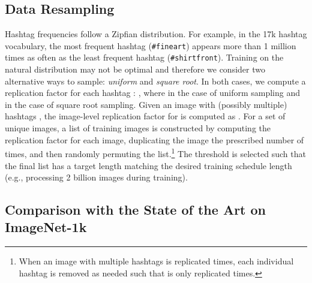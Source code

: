 \documentclass[runningheads]{llncs}
\makeatletter
\newcommand{\eg}{e.g.\@\xspace}
\makeatother
\begin{document}
\subsection{Data Resampling}
Hashtag frequencies follow a Zipfian distribution. For example, in the 17k hashtag vocabulary, the most frequent hashtag (\texttt{\#fineart}) appears more than 1 million times as often as the least frequent hashtag (\texttt{\#shirtfront}). Training on the natural distribution may not be optimal and therefore we consider two alternative ways to sample: \emph{uniform} and \emph{square root}. In both cases, we compute a replication factor  for each hashtag : , where  in the case of uniform sampling and  in the case of square root sampling. Given an image  with (possibly multiple) hashtags , the image-level replication factor for  is computed as . For a set of  unique images, a list of training images is constructed by computing the replication factor for each image, duplicating the image the prescribed number of times, and then randomly permuting the list.\footnote{When an image with multiple hashtags is replicated  times, each individual hashtag  is removed as needed such that  is only replicated  times.} The threshold  is selected such that the final list has a target length matching the desired training schedule length (\eg, processing 2 billion images during training).

\subsection{Comparison with the State of the Art on ImageNet-1k}
\end{document}
